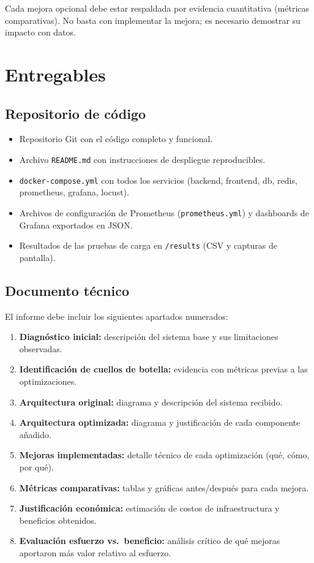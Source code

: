 \documentclass[12pt,a4paper]{article}
\begin{document}
\begin{warningbox}
Cada mejora opcional debe estar respaldada por evidencia cuantitativa (métricas comparativas). No basta con implementar la mejora; es necesario demostrar su impacto con datos.
\end{warningbox}

\section{Entregables}

\subsection{Repositorio de código}

\begin{itemize}
  \item Repositorio Git con el código completo y funcional.
  \item Archivo \texttt{README.md} con instrucciones de despliegue reproducibles.
  \item \texttt{docker-compose.yml} con todos los servicios (backend, frontend, db, redis, prometheus, grafana, locust).
  \item Archivos de configuración de Prometheus (\texttt{prometheus.yml}) y dashboards de Grafana exportados en JSON.
  \item Resultados de las pruebas de carga en \texttt{/results} (CSV y capturas de pantalla).
\end{itemize}

\subsection{Documento técnico}

El informe debe incluir los siguientes apartados numerados:

\begin{enumerate}
  \item \textbf{Diagnóstico inicial:} descripción del sistema base y sus limitaciones observadas.
  \item \textbf{Identificación de cuellos de botella:} evidencia con métricas previas a las optimizaciones.
  \item \textbf{Arquitectura original:} diagrama y descripción del sistema recibido.
  \item \textbf{Arquitectura optimizada:} diagrama y justificación de cada componente añadido.
  \item \textbf{Mejoras implementadas:} detalle técnico de cada optimización (qué, cómo, por qué).
  \item \textbf{Métricas comparativas:} tablas y gráficas antes/después para cada mejora.
  \item \textbf{Justificación económica:} estimación de costos de infraestructura y beneficios obtenidos.
  \item \textbf{Evaluación esfuerzo vs.\ beneficio:} análisis crítico de qué mejoras aportaron más valor relativo al esfuerzo.
\end{enumerate}
\end{document}
